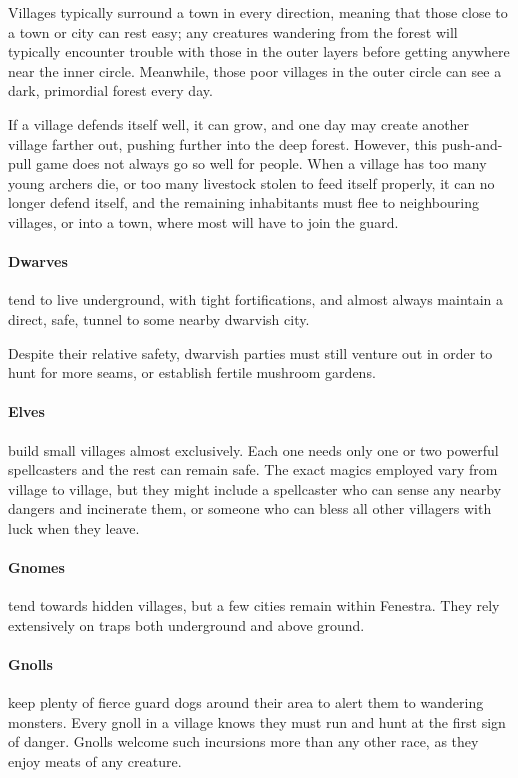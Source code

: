 \begin{multicols}{2}
Villages typically surround a town in every direction, meaning that those close to a town or city can rest easy;
any creatures wandering from the forest will typically encounter trouble with those in the outer layers before getting anywhere near the inner circle.
Meanwhile, those poor villages in the outer circle can see a dark, primordial forest every day.

If a village defends itself well, it can grow, and one day may create another village farther out, pushing further into the deep forest.
However, this push-and-pull game does not always go so well for people.
When a village has too many young archers die, or too many livestock stolen to feed itself properly, it can no longer defend itself, and the remaining inhabitants must flee to neighbouring villages, or into a town, where most will have to join the \gls{guard}.

\paragraph{Dwarves} tend to live underground, with tight fortifications, and almost always maintain a direct, safe, tunnel to some nearby dwarvish city.

Despite their relative safety, dwarvish parties must still venture out in order to hunt for more seams, or establish fertile mushroom gardens.

\paragraph{Elves} build small villages almost exclusively.
Each one needs only one or two powerful spellcasters and the rest can remain safe.
The exact magics employed vary from village to village, but they might include a spellcaster who can sense any nearby dangers and incinerate them, or someone who can bless all other villagers with luck when they leave.

\paragraph{Gnomes} tend towards hidden villages, but a few cities remain within Fenestra.
They rely extensively on traps both underground and above ground.

\paragraph{Gnolls} keep plenty of fierce guard dogs around their area to alert them to wandering monsters.
Every gnoll in a village knows they must run and hunt at the first sign of danger.
Gnolls welcome such incursions more than any other race, as they enjoy meats of any creature.


\end{multicols}
